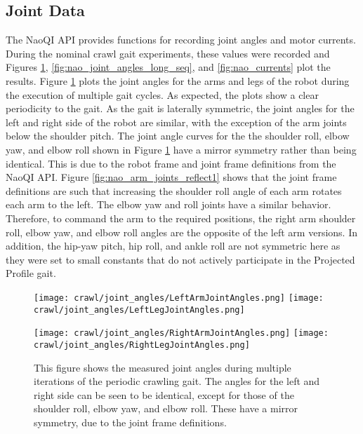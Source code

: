 \subsection{Joint Data} \label{subsec:nom_crawl_joint_data}
The NaoQI API provides functions for recording joint angles and motor currents. During the
nominal crawl gait experiments, these values were recorded and Figures \ref{fig:nao_joint_angles1},
\ref{fig:nao_joint_angles_long_seq}, and \ref{fig:nao_currents} plot the results.
Figure \ref{fig:nao_joint_angles1} plots the joint angles for the arms and legs of the
robot during the execution of multiple gait cycles. As expected, the plots show a clear
periodicity to the gait.
As the gait is laterally symmetric, the joint angles for the left and right side of the robot
are similar, with the exception of the arm joints below the shoulder pitch.
The joint angle curves for the the shoulder roll, elbow yaw, and elbow roll 
shown in Figure \ref{fig:nao_joint_angles1} have a mirror symmetry rather than being identical.
This is due to the robot frame and joint frame definitions from the NaoQI API.
Figure \ref{fig:nao_arm_joints_reflect1} shows that the joint frame definitions
are such that increasing the shoulder roll angle of each arm rotates each arm to the left.
The elbow yaw and roll joints have a similar behavior. Therefore, to command the arm to
the required positions, the right arm shoulder roll, elbow yaw, and elbow roll angles
are the opposite of the left arm versions.
In addition, the hip-yaw pitch, hip roll, and ankle roll are not symmetric here as they
were set to small constants that do not actively participate in the Projected Profile gait.

\begin{figure}
  \centerline{
    \texttt{[image: crawl/joint\_angles/LeftArmJointAngles.png]}
    \texttt{[image: crawl/joint\_angles/LeftLegJointAngles.png]}
  }
  \centerline{
    \texttt{[image: crawl/joint\_angles/RightArmJointAngles.png]}
    \texttt{[image: crawl/joint\_angles/RightLegJointAngles.png]}
  }
  \caption{This figure shows the measured joint angles during multiple iterations of the periodic crawling gait.
           The angles for the left and right side can be seen to be identical, except for those
           of the shoulder roll, elbow yaw, and elbow roll. These have a mirror symmetry, due to
           the joint frame definitions.}
  \label{fig:nao_joint_angles1}
\end{figure}

